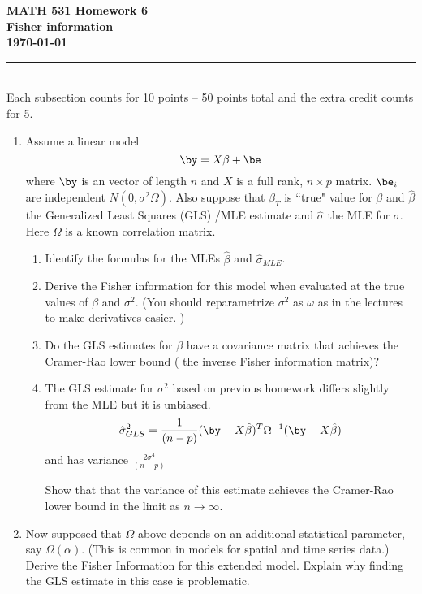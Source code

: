 \documentclass[10pt]{report}
\begin{document}
\vspace*{-1in}
\noindent
{\LARGE  \bf  \sc  MATH 531  Homework 6  \\
  }
\noindent
{\Large \bf   Fisher information  \\ \today} 
\ \\
{\color{orange3} \hrule  }
\ \\
Each subsection counts for 10 points  -- 50 points total and the extra credit counts for 5.  
\begin{enumerate}
\item  
 Assume a linear model 
\[  \by = X \beta + \be \]
where $\by$ is an vector of length $n$ and $X$ is a full rank,
 $n\times p$ matrix. $\be_i$ are independent $N(0,\sigma^2\Omega)$. Also suppose that $\beta_T$ is ``true" value for $\beta$ and $\hat \beta$ the Generalized Least Squares (GLS) /MLE estimate and $\hat{\sigma}$ the MLE for $\sigma$. Here $\Omega$ is a known correlation matrix. 

\begin{enumerate}
 \item Identify the formulas for the MLEs $\hat \beta$ and  $\hat{\sigma}_{MLE}$.
 \item Derive the Fisher information for this model when evaluated at the true values of $\beta$ and $\sigma^2$.
 (You should reparametrize $\sigma^2$ as $\omega$ as in the lectures to make derivatives easier. )
 
 \item Do the GLS estimates for $\beta$ have a covariance matrix that achieves the Cramer-Rao lower bound (
  the inverse Fisher information matrix)?
 \item The  GLS estimate for $\sigma^2$  based on previous homework differs slightly from the MLE but it is unbiased. 
 \[ \hat{\sigma}^2_{GLS} =  \frac{1}{(n-p)} (\by - X\hat{\beta})^T \Omega^{-1} (\by - X\hat{\beta}) \] 
 and has variance 
$ \frac{2\sigma^4}{(n-p)}$
 
 Show that that the variance of this estimate achieves the Cramer-Rao lower bound in the limit as $n \rightarrow \infty$.
 \end{enumerate}
 


\item 
 Now supposed that $\Omega$ above depends on an additional statistical parameter, say $\Omega(\alpha)$. 
 (This is common in models for spatial and time series data.)
 Derive the Fisher Information for this extended model. Explain why finding the GLS estimate in this case is problematic.   

 \end{enumerate}
 
\end{document}
